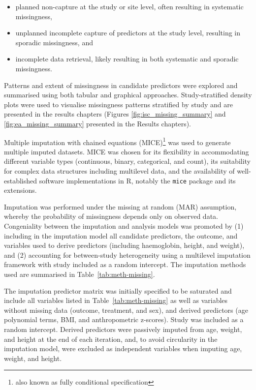 \begin{itemize}[noitemsep]
  \item planned non-capture at the study or site level, often resulting in systematic missingness,
  \item unplanned incomplete capture of predictors at the study level, resulting in sporadic missingness, and
  \item incomplete data retrieval, likely resulting in both systematic and sporadic missingness.
\end{itemize}

Patterns and extent of missingness in candidate predictors were explored and summarised using both tabular and graphical approaches. Study-stratified density plots were used to visualise missingness patterns stratified by study and are presented in the results chapters (Figures \ref{fig:isc_missing_summary} and \ref{fig:ea_missing_summary} presented in the Results chapters).

Multiple imputation with chained equations (MICE)\footnote{also known as fully conditional specification} was used to generate multiple imputed datasets\cite{white2011,van_buuren2021}. MICE was chosen for its flexibility in accommodating different variable types (continuous, binary, categorical, and count), its suitability for complex data structures including multilevel data, and the availability of well-established software implementations in R, notably the \texttt{mice} package and its extensions\cite{van-buuren2011,audigier2023}.

Imputation was performed under the missing at random (MAR) assumption, whereby the probability of missingness depends only on observed data\cite{rubin1987}. Congeniality between the imputation and analysis models was promoted by (1) including in the imputation model all candidate predictors, the outcome, and variables used to derive predictors (including haemoglobin, height, and weight), and (2) accounting for between-study heterogeneity using a multilevel imputation framework with study included as a random intercept\cite{white2011}. The imputation methods used are summarised in Table~\ref{tab:meth-missing}.



The imputation predictor matrix was initially specified to be saturated and include all variables listed in Table~\ref{tab:meth-missing} as well as variables without missing data (outcome, treatment, and sex), and derived predictors (age polynomial terms, BMI, and anthropometric z-scores). Study was included as a random intercept. Derived predictors were passively imputed from age, weight, and height at the end of each iteration, and, to avoid circularity in the imputation model, were excluded as independent variables when imputing age, weight, and height.

